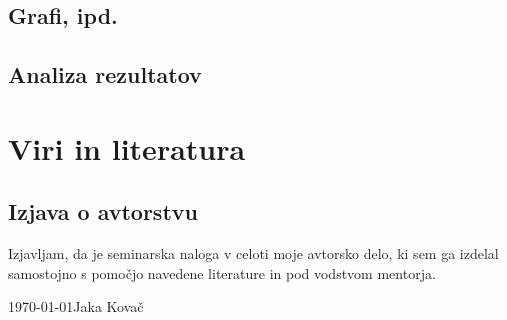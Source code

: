 \documentclass[12pt]{article}
\begin{document}
	\subsection*{Grafi, ipd.}
	\subsection*{Analiza rezultatov}



\newpage
\begingroup
\makeatletter
	\section{Viri in literatura}
	\nocite{*}
	\printbibliography[heading=none]
\makeatother
\endgroup
\newpage

\begin{samepage}
	\thispagestyle{empty}
	\section*{Izjava o avtorstvu}
	Izjavljam, da je seminarska naloga v celoti moje avtorsko delo, ki sem ga 
	izdelal samostojno s pomočjo navedene literature in pod vodstvom mentorja.

	\vfill
	
	\today \hfill Jaka Kovač
	
	\vspace{3 cm}
\end{samepage}
\end{document}
